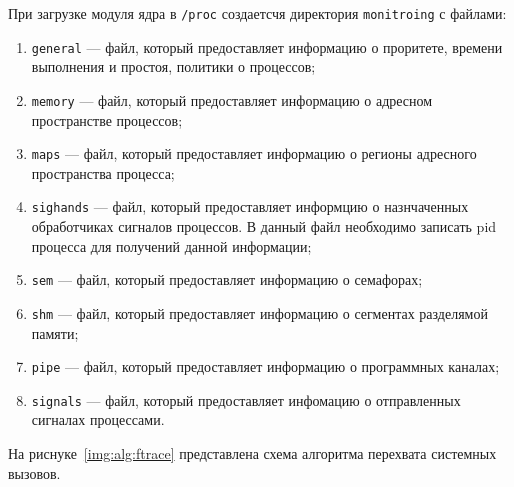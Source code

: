 При загрузке модуля ядра в \texttt{/proc} создаетсчя директория \texttt{monitroing} с файлами:
\begin{enumerate}
	\item \texttt{general} --- файл, который предоставляет информацию о проритете, времени выполнения и простоя, политики о процессов;
	\item \texttt{memory} --- файл, который предоставляет информацию о адресном пространстве процессов;
	\item \texttt{maps} --- файл, который предоставляет информацию о регионы адресного пространства процесса;
	\item \texttt{sighands} --- файл, который предоставляет информцию о назнчаченных обработчиках сигналов процессов. В данный файл необходимо записать pid процесса для получений данной информации;
	\item \texttt{sem} --- файл, который предоставляет информацию о семафорах;
	\item \texttt{shm} --- файл, который предоставляет информацию о сегментах разделямой памяти;
	\item \texttt{pipe} --- файл, который предоставляет информацию о программных каналах;
	\item \texttt{signals} --- файл, который предоставляет инфомацию о отправленных сигналах процессами.      
\end{enumerate}

На риснуке~\ref{img:alg:ftrace} представлена схема алгоритма перехвата системных вызовов.

